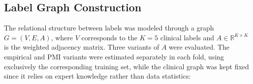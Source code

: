 \documentclass[12pt]{article}
\begin{document}



\subsection{Label Graph Construction}

The relational structure between labels was modeled through a graph $G = (V, E, A)$, where $V$ corresponds to the $K=5$ clinical labels and $A \in \mathbb{R}^{K\times K}$ is the weighted adjacency matrix. Three variants of $A$ were evaluated. The empirical and PMI variants were estimated separately in each fold, using exclusively the corresponding training set, while the clinical graph was kept fixed since it relies on expert knowledge rather than data statistics:
\end{document}
